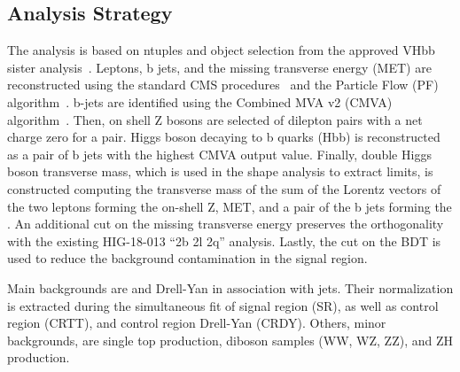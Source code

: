 \subsection{Analysis Strategy}

The analysis is based on ntuples and object selection from the approved VHbb sister analysis~\cite{VHbb_inspire}. Leptons, b jets, and the missing transverse energy (MET) are reconstructed using the standard CMS procedures~\cite{CMSreco} and the Particle Flow (PF) algorithm~\cite{PFalgo}. b-jets are identified using the Combined MVA v2 (CMVA) algorithm~\cite{BTagtwiki}. Then, on shell Z bosons are selected of dilepton pairs with a net charge zero for a pair. Higgs boson decaying to b quarks (Hbb) is reconstructed as a pair of b jets with the highest CMVA output value. Finally, double Higgs boson transverse mass, which is used in the shape analysis to extract limits, is constructed computing the transverse mass of the sum of the Lorentz vectors of the two leptons forming the on-shell Z, MET, and a pair of the b jets forming the \HBB. An additional cut on the missing transverse energy preserves the orthogonality with the existing HIG-18-013 ``2b 2l 2q'' analysis. Lastly, the cut on the BDT is used to reduce the background contamination in the signal region.

Main backgrounds are \ttbar and Drell-Yan in association with jets. Their normalization is extracted during the simultaneous fit of signal region (SR), as well as control region \ttbar (CRTT), and control region Drell-Yan (CRDY). Others, minor backgrounds, are single top production, diboson samples (WW, WZ, ZZ), and ZH production. 
